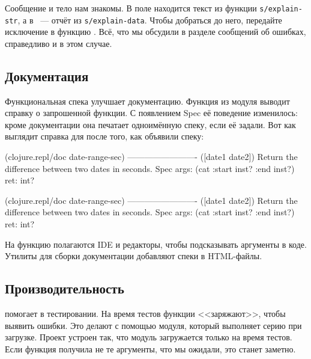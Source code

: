 Сообщение и тело нам знакомы. В поле  находится текст из функции
\texttt{s/ex\-plain-\-str}, а в ~--- отчёт из \texttt{s/ex\-plain-\-da\-ta}.
Чтобы добраться до него, передайте исключение в функцию . Всё,
что мы обсудили в разделе сообщений об ошибках, справедливо и в этом случае.

\subsection{Документация}


Функциональная спека улучшает документацию. Функция  из модуля
 выводит справку о запрошенной функции. С появлением Spec её
поведение изменилось: кроме документации она печатает одноимённую спеку, если её
задали. Вот как выглядит справка для  после того, как
объявили спеку:

\ifnarrow

\begin{clojure}
(clojure.repl/doc date-range-sec)
-------------------------
([date1 date2])
  Return the difference
            between two dates in seconds.
Spec
  args: (cat :start inst? :end inst?)
  ret: int?
\end{clojure}

\else

\begin{clojure}
(clojure.repl/doc date-range-sec)
-------------------------
([date1 date2])
  Return the difference between two dates in seconds.
Spec
  args: (cat :start inst? :end inst?)
  ret: int?
\end{clojure}

\fi

На функцию  полагаются IDE и редакторы, чтобы подсказывать аргументы в
коде. Утилиты для сборки документации добавляют спеки в HTML-файлы.

\subsection{Производительность}


 помогает в тестировании. На время тестов функции <<заряжают>>,
чтобы выявить ошибки. Это делают с помощью модуля, который выполняет серию
 при загрузке. Проект устроен так, что модуль загружается
только на время тестов. Если функция получила не те аргументы, что мы ожидали,
это станет заметно.

